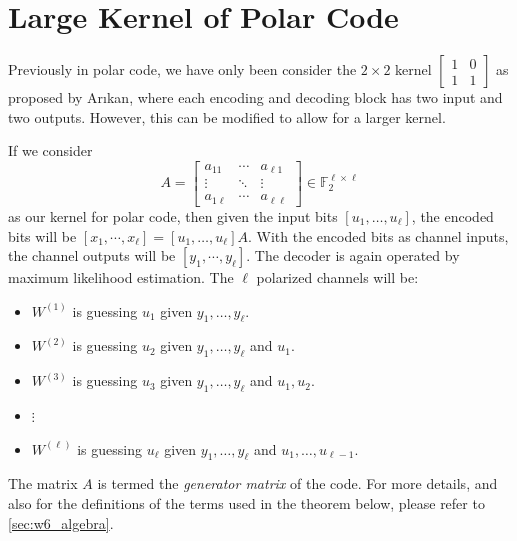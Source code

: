 \section{Large Kernel of Polar Code}
Previously in polar code, we have only been consider the $2\times 2$ kernel $\left[\begin{matrix}
    1 & 0 \\ 1 & 1
\end{matrix}\right]$ as proposed by Ar{\i}kan, where each encoding and decoding block has two input and two outputs. However, this can be modified to allow for a larger kernel.

If we consider
\begin{equation*}
    A = \left[\begin{matrix}
        a_{11} & \cdots & a_{\ell1} \\
        \vdots & \ddots & \vdots \\
        a_{1\ell} & \cdots & a_{\ell\ell}
    \end{matrix}\right] \in \mathbb{F}_2^{\ell\times\ell}
\end{equation*}
as our kernel for polar code, then given the input bits $[u_1,\ldots,u_\ell]$, the encoded bits will be $[x_1,\cdots,x_\ell] = [u_1,\ldots,u_\ell] A$. With the encoded bits as channel inputs, the channel outputs will be $[y_1,\cdots,y_\ell]$. The decoder is again operated by maximum likelihood estimation. The $\ell$ polarized channels will be:
\begin{itemize}
    \item $W^{(1)}$ is guessing $u_1$ given $y_1,\ldots,y_\ell$.
    \item $W^{(2)}$ is guessing $u_2$ given $y_1,\ldots,y_\ell$ and $u_1$.
    \item $W^{(3)}$ is guessing $u_3$ given $y_1,\ldots,y_\ell$ and $u_1,u_2$.
    \item $\vdots$
    \item $W^{(\ell)}$ is guessing $u_\ell$ given $y_1,\ldots,y_\ell$ and $u_1,\ldots,u_{\ell-1}$.
\end{itemize}
The matrix $A$ is termed the \textit{generator matrix} of the code. For more details, and also for the definitions of the terms used in the theorem below, please refer to \autoref{sec:w6_algebra}.

